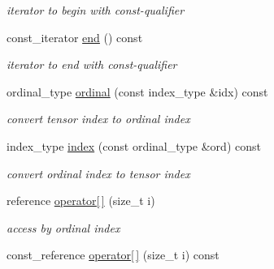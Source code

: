\begin{DoxyCompactItemize}
\begin{DoxyCompactList}\small\item\em iterator to begin with const-\/qualifier \item\end{DoxyCompactList}\item 
\hypertarget{classbtas_1_1_tensor_aad9139a8d91fc000d30e639732423ae7}{
const\_\-iterator \hyperlink{classbtas_1_1_tensor_aad9139a8d91fc000d30e639732423ae7}{end} () const }
\label{classbtas_1_1_tensor_aad9139a8d91fc000d30e639732423ae7}

\begin{DoxyCompactList}\small\item\em iterator to end with const-\/qualifier \item\end{DoxyCompactList}\item 
\hypertarget{classbtas_1_1_tensor_aabaaa960eb00445859c03484aab25d90}{
ordinal\_\-type \hyperlink{classbtas_1_1_tensor_aabaaa960eb00445859c03484aab25d90}{ordinal} (const index\_\-type \&idx) const }
\label{classbtas_1_1_tensor_aabaaa960eb00445859c03484aab25d90}

\begin{DoxyCompactList}\small\item\em convert tensor index to ordinal index \item\end{DoxyCompactList}\item 
\hypertarget{classbtas_1_1_tensor_aabbaadbdfb1c4835d793adc1d9f1dea1}{
index\_\-type \hyperlink{classbtas_1_1_tensor_aabbaadbdfb1c4835d793adc1d9f1dea1}{index} (const ordinal\_\-type \&ord) const }
\label{classbtas_1_1_tensor_aabbaadbdfb1c4835d793adc1d9f1dea1}

\begin{DoxyCompactList}\small\item\em convert ordinal index to tensor index \item\end{DoxyCompactList}\item 
\hypertarget{classbtas_1_1_tensor_ac34187f462cd1105ded134e96f9adaee}{
reference \hyperlink{classbtas_1_1_tensor_ac34187f462cd1105ded134e96f9adaee}{operator\mbox{[}$\,$\mbox{]}} (size\_\-t i)}
\label{classbtas_1_1_tensor_ac34187f462cd1105ded134e96f9adaee}

\begin{DoxyCompactList}\small\item\em access by ordinal index \item\end{DoxyCompactList}\item 
\hypertarget{classbtas_1_1_tensor_acefca765f735462ff9e1ae912119c38b}{
const\_\-reference \hyperlink{classbtas_1_1_tensor_acefca765f735462ff9e1ae912119c38b}{operator\mbox{[}$\,$\mbox{]}} (size\_\-t i) const }
\label{classbtas_1_1_tensor_acefca765f735462ff9e1ae912119c38b}


\end{DoxyCompactItemize}
